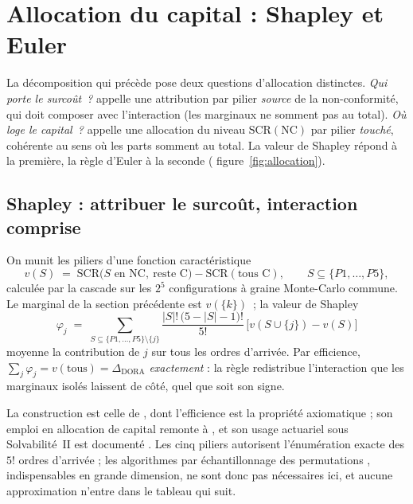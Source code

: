 \section{Allocation du capital : Shapley et Euler}
\label{sec:allocation}

La décomposition qui précède pose deux questions d'allocation distinctes. \emph{Qui porte le
surcoût~?} appelle une attribution par pilier \emph{source} de la non-conformité, qui doit
composer avec l'interaction (les marginaux ne somment pas au total). \emph{Où loge le
capital~?} appelle une allocation du niveau $\mathrm{SCR}(\text{NC})$ par pilier
\emph{touché}, cohérente au sens où les parts somment au total. La valeur de Shapley répond
à la première, la règle d'Euler à la seconde (%
figure~\ref{fig:allocation}).

\subsection{Shapley : attribuer le surcoût, interaction comprise}

On munit les piliers d'une fonction caractéristique
\[
v(S) \;=\; \mathrm{SCR}\bigl(S \text{ en NC},\ \text{reste C}\bigr)-\mathrm{SCR}(\text{tous C}),
\qquad S \subseteq \{P1,\dots,P5\},
\]
calculée par la cascade sur les $2^5$ configurations à graine Monte-Carlo commune. Le
marginal de la section précédente est $v(\{k\})$~; la valeur de Shapley
\[
\varphi_j \;=\; \sum_{S \subseteq \{P1,\dots,P5\}\setminus\{j\}}
\frac{|S|!\,\bigl(5-|S|-1\bigr)!}{5!}\,\bigl[v(S\cup\{j\})-v(S)\bigr]
\]
moyenne la contribution de $j$ sur tous les ordres d'arrivée. Par efficience,
$\sum_j \varphi_j = v(\text{tous}) = \Delta_{\text{DORA}}$ \emph{exactement} : la règle
redistribue l'interaction que les marginaux isolés laissent de côté, quel que soit son signe.

La construction est celle de \citet{Shapley1953}, dont l'efficience est la propriété
axiomatique ; son emploi en allocation de capital remonte à \citet{denault2001}, et son usage
actuariel sous Solvabilité~II est documenté \citep{Decupere2011}. Les cinq piliers autorisent l'énumération exacte des $5!$
ordres d'arrivée ; les algorithmes par échantillonnage des permutations
\citep{CastroGomezTejada2009, SongNelsonStaum2016}, indispensables en grande dimension, ne
sont donc pas nécessaires ici, et aucune approximation n'entre dans le tableau qui suit.


